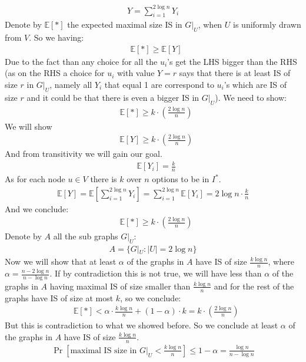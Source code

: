 \documentclass[11pt]{article}
\theoremstyle{plain}
\theoremstyle{nonumberplainnobrackets}
\begin{document}
\begin{align*}
Y = \sum_{i=1}^{2\log n} Y_i
\end{align*}
Denote by $\mathbb{E}[*]$ the expected maximal size IS in $G|_U$, when $U$ is uniformly drawn from $V$. 
So we having:
\begin{align*}
&\mathbb{E}[*] \ge \mathbb{E}[Y]
\end{align*}
Due to the fact than any choice for all the $u_i$'s get the LHS bigger than the RHS (as on the RHS a choice for $u_i$ with value $Y=r$ says that there is at least IS of size $r$ in $G|_U$, namely all $Y_i$ that equal 1 are correspond to $u_i$'s which are IS of size $r$ and it could be that there is even a bigger IS in $G|_U$).
We need to show:
	\begin{align*}
&\mathbb{E}[*] \ge k \cdot(\frac{2\log n}{n} ) 
\end{align*}
We will show \begin{align*}
& \mathbb{E}[Y] \ge  k \cdot(\frac{2\log n}{n} ) 
\end{align*}
And from transitivity we will gain our goal. 
\begin{align*}
&\mathbb{E}[Y_i] = \frac{k}{n}
\end{align*}
As for each node $u\in V$ there is $k$ over $n$ options to be in $I^*$.
\begin{align*}
\mathbb{E}[Y] = \mathbb{E}[ \sum_{i=1}^{2\log n} Y_i] =  \sum_{i=1}^{2\log n} \mathbb{E}[ Y_i] = 2\log n \cdot \frac{k}{n}
\end{align*}
And we conclude:
	\begin{align*}
&\mathbb{E}[*] \ge k \cdot(\frac{2\log n}{n} ) 
\end{align*}
Denote by $A$ all the sub graphs $G|_U$:
\begin{align*}
A= \{ G|_U : |U|=2\log n  \}
\end{align*}
Now we will show that at least $\alpha$ of the graphs in $A$ have IS of size $\frac{k\log n }{n}$, where $\alpha=\frac{n-2\log n}{n-\log n}$. If by contradiction this is not true, we will have less than $\alpha$ of the graphs in $A$ having maximal IS of size smaller than $\frac{k\log n }{n}$ and for the rest of the graphs have IS of size at most $k$, so we conclude:
	\begin{align*}
&\mathbb{E}[*] < \alpha \cdot \frac{k\log n}{n}  + (1-\alpha)\cdot k = k \cdot(\frac{2\log n}{n} ) 
\end{align*}
But this is contradiction to what we showed before. So we conclude at least $\alpha$ of the graphs in $A$ have IS of size $\frac{k\log n }{n}$.
\begin{align*}
\Pr[\text{maximal IS size in }G|_U < \frac{k\log n }{n}]\le 1-\alpha = \frac{\log n}{n- \log n}
\end{align*}
\end{document}
